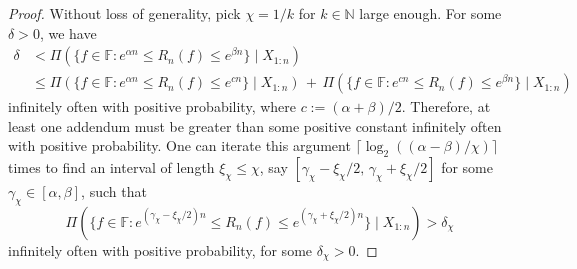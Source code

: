 \documentclass[10pt,a4paper]{amsart}
\def\FF{\mathbb{F}}
\def\NN{\mathbb{N}}
\begin{document}
\begin{proof}
    Without loss of generality, pick $\chi=1/k$ for $k\in\NN$ large enough. For some $\delta>0$, we have
    \begin{align*}
        \delta & < \Pi(\{f\in\FF : e^{\alpha n}\leq R_n(f)\leq e^{\beta n}\}\mid X_{1:n}) \\
        & \leq   \Pi(\{f\in\FF : e^{\alpha n}\leq R_n(f)\leq e^{cn}\}\mid X_{1:n}) \, + \, \Pi(\{f\in\FF : e^{cn}\leq R_n(f)\leq e^{\beta n}\}\mid X_{1:n})
    \end{align*}
    infinitely often with positive probability, where $c:=(\alpha+\beta)/2$. Therefore, at least one addendum must be greater than some positive constant infinitely often with positive probability. One can iterate this argument $\lceil\log_2((\alpha-\beta)/\chi)\rceil$ times to find an interval of length $\xi_\chi\leq \chi$, say $[\gamma_\chi - \xi_\chi/2,\, \gamma_\chi+\xi_\chi/2]$ for some $\gamma_\chi\in[\alpha,\beta]$, such that
    \begin{equation*}
        \Pi(\{f\in\FF : e^{(\gamma_\chi - \xi_\chi/2) n}\leq R_n(f)\leq e^{(\gamma_\chi+\xi_\chi/2) n}\}\mid X_{1:n}) > \delta_\chi
    \end{equation*}
    infinitely often with positive probability, for some $\delta_\chi>0$.


\end{proof}
\end{document}
